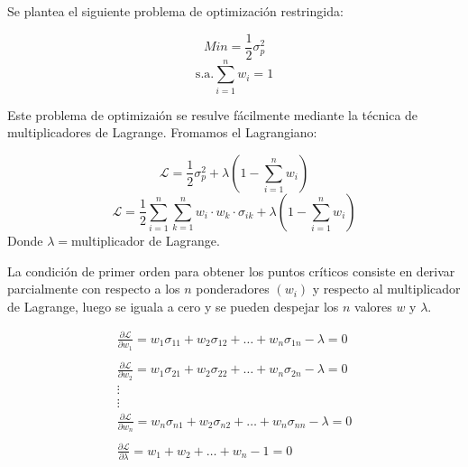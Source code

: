 \documentclass[12pt]{book} %
\begin{document}
Se plantea el siguiente problema de optimización restringida:

$$Min=\frac{1}{2}\sigma_{p}^2$$
$$\text{s.a.}  \sum\limits_{i=1}^{n}w_i=1 $$

Este problema de optimizaión se resulve fácilmente mediante la técnica de multiplicadores de Lagrange. Fromamos el Lagrangiano:

$$\mathcal{L} = \frac{1}{2}\sigma_{p}^2 + \lambda (1 -\sum\limits_{i=1}^{n}w_i) $$
$$\mathcal{L} = \frac{1}{2}\sum_{i=1}^{n}\sum_{k=1}^{n}w_i\cdot w_k\cdot \sigma_{ik} + \lambda (1 -\sum\limits_{i=1}^{n}w_i) $$
Donde $\lambda=$multiplicador de Lagrange.

La condición de primer orden para obtener los puntos críticos consiste en derivar parcialmente con respecto a los $n$ ponderadores $(w_i)$ y respecto al multiplicador de Lagrange, luego se iguala a cero y se pueden despejar los $n$ valores $w$ y $\lambda$.

$$
\begin{matrix}
\frac{\partial\mathcal{L}}{\partial w_1}=w_1\sigma_{11}+w_2\sigma_{12}+\ldots+w_n\sigma_{1n}-\lambda=0 \\ 
\\
\frac{\partial\mathcal{L}}{\partial w_2}=w_1\sigma_{21}+w_2\sigma_{22}+\ldots+w_n\sigma_{2n}-\lambda=0\\ 
\vdots \\ 
\vdots \\ 
\frac{\partial\mathcal{L}}{\partial w_n}=w_n\sigma_{n1}+w_2\sigma_{n2}+\ldots+w_n\sigma_{nn}-\lambda=0\\  
\\
\frac{\partial\mathcal{L}}{\partial \lambda}=w_1+w_2+\ldots+w_n-1=0
\end{matrix}
$$
\end{document}
